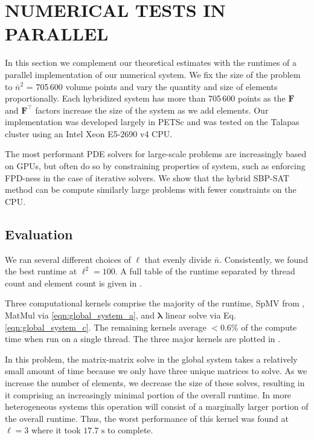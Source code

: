 %
%
%
\section{NUMERICAL TESTS IN PARALLEL}

%
%
%


%
%
%
In this section we complement our theoretical estimates with the runtimes of a parallel implementation of our numerical system. 
We fix the size of the problem to $\bar{n}^2$ = 705\,600 volume points and vary the quantity and size of elements proportionally. 
Each hybridized system has more than 705\,600 points as the $\mathbf{F}$ and $\mathbf{F}^{\intercal}$ factors increase the size of the system as we add elements.
Our implementation was developed largely in PETSc and was tested on the Talapas cluster using an Intel Xeon E5-2690 v4 CPU.


The most performant PDE solvers for large-scale problems are increasingly based on GPUs, but often do so by constraining properties of system, such as enforcing FPD-ness in the case of iterative solvers. We show that the hybrid SBP-SAT method can be compute similarly large problems with fewer constraints on the CPU.  

%
%
%
\subsection{Evaluation}

%
%
%
We ran several different choices of $\ell$ that evenly divide $\bar{n}$. Consistently, we found the best runtime at $\ell^2 = 100$. 
A full table of the runtime separated by thread count and element count is given in .

%
%
%
Three computational kernels comprise the majority of the runtime, SpMV from , MatMul via \eqref{eqn:global_system_a}, and $\symbf{\lambda}$ linear solve via Eq. \eqref{eqn:global_system_c}.
The remaining kernels average $<0.6\%$ of the compute time when run on a single thread. 
The three major kernels are plotted in .

%
%
%


%
%
%
In this problem, the matrix-matrix solve in the global system takes a relatively small amount of time because we only have three unique matrices to solve. 
As we increase the number of elements, we decrease the size of these solves, resulting in it comprising an increasingly minimal portion of the overall runtime. 
In more heterogeneous systems this operation will consist of a marginally larger portion of the overall runtime.
Thus, the worst performance of this kernel was found at $\ell = 3$ where it took $17.7 \text{ s}$ to complete.

